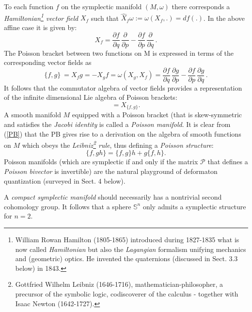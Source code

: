 To each function $f$ on the symplectic manifold $(M, \omega)$
there corresponds a {\it Hamiltonian\footnote{William Rowan Hamilton (1805-1865)
introduced during 1827-1835 what is now called {\it Hamiltonian} but also the
{\it Lagangian} formalism unifying mechanics and (geometric) optics. He invented 
the quaternions (discussed in Sect. 3.3 below) in 1843.} vector field} 
$X_f$ such that $\hat{X}_f\omega := \omega(X_f, .) = df(.)$. In the above affine
 case it is given by:
\begin{equation}
X_f = \frac{\partial f}{\partial q} \, \frac{\partial}{\partial p} -
\frac{\partial f}{\partial p} \, \frac{\partial}{\partial q} \, .
\end{equation}
The Poisson bracket between two functions on M is expressed in terms of the
corresponding vector fields as
\begin{equation}
\label{PB}
\{f , g\}\ = X_f g = -X_g f = \omega(X_g, X_f) = \frac{\partial f}{\partial q} \, \frac{\partial g}{\partial p} - \frac{\partial f}{\partial p} \, \frac{\partial g}{\partial q} \, .
\end{equation}
It follows that the commutator algebra of vector fields provides a representation
of the infinite dimensional Lie algebra of Poisson brackets:
\begin{equation}
 [X_f, X_g] = X_{\{f , g\}}.
\end{equation}
A smooth manifold $M$ equipped with a Poisson bracket (that is skew-symmetric and satisfies the {\it Jacobi identity} is called
a {\it Poisson manifold}. It is clear from (\ref{PB}) that the PB gives rise to a derivation on the algebra of smooth functions 
on $M$ which obeys the {\it Leibniz\footnote{Gottfried Wilhelm Leibniz (1646-1716), mathematician-philosopher, a precursor of the symbolic logic, codiscoverer of the calculus - together with Isaac Newton (1642-1727).} rule}, thus defining a {\it Poisson structure}:
\begin{equation}
\label{Leib}
\{f, gh\} = \{f, g\} h + g\{f, h\}. 
\end{equation}
Poisson manifolds (which are symplectic if and only if the matrix ${\mathcal P}$ that defines a {\it Poisson bivector} is
invertible) are the natural playground of deformaton quantization (surveyed in Sect. 4 below).
 
A {\it compact symplectic manifold} should necessarily has a nontrivial second cohomology 
group. It follows that a sphere ${\mathbb S}^n$ only admits a symplectic 
structure for $n = 2$. 


